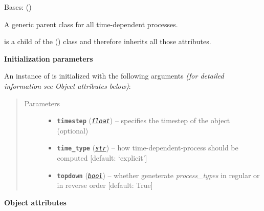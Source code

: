 \documentclass[a4paper,10pt,english]{sphinxmanual}
\begin{document}
\begin{fulllineitems}
\label{api/climlab.process:climlab.process.time_dependent_process.TimeDependentProcess}
Bases: {\hyperref[api/climlab.process:climlab.process.process.Process]{\emph{}}} ()

A generic parent class for all time-dependent processes.

 is a child of the 
{\hyperref[api/climlab.process:climlab.process.process.Process]{\emph{}}} () class and therefore inherits
all those attributes.

\textbf{Initialization parameters}

An instance of  is initialized with the following 
arguments \emph{(for detailed information see Object attributes below)}:
\begin{quote}\begin{description}
\item[{Parameters}] \leavevmode\begin{itemize}
\item {} 
\textbf{\texttt{timestep}} (\href{http://docs.python.org/2.7/library/functions.html\#float}{\emph{\texttt{float}}}) -- specifies the timestep of the object (optional)

\item {} 
\textbf{\texttt{time\_type}} (\href{http://docs.python.org/2.7/library/functions.html\#str}{\emph{\texttt{str}}}) -- how time-dependent-process should be computed 
{[}default: `explicit'{]}

\item {} 
\textbf{\texttt{topdown}} (\href{http://docs.python.org/2.7/library/functions.html\#bool}{\emph{\texttt{bool}}}) -- whether geneterate \emph{process\_types} in regular or 
in reverse order {[}default: True{]}

\end{itemize}

\end{description}\end{quote}

\textbf{Object attributes}


\end{fulllineitems}
\end{document}
